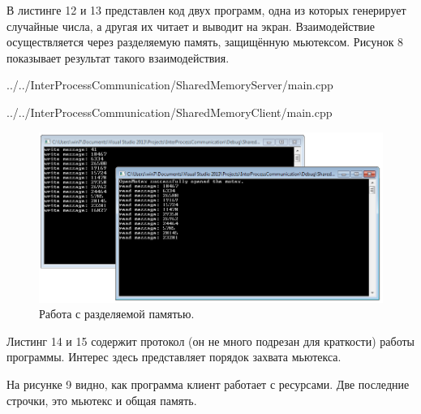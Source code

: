\documentclass[a4paper, 12pt]{report}		%
\begin{document}
В листинге 12 и 13 представлен код двух программ, одна из которых генерирует случайные числа, а другая их читает и выводит на экран. Взаимодействие осуществляется через разделяемую память, защищённую мьютексом. Рисунок 8 показывает результат такого взаимодействия.


{../../InterProcessCommunication/SharedMemoryServer/main.cpp}

\vspace{3em}


{../../InterProcessCommunication/SharedMemoryClient/main.cpp}

\newpage
\begin{figure}[h!]
\centering
\includegraphics[scale=0.75]{res/08_Sharedmemory}
\caption{Работа с разделяемой памятью.}
\end{figure}

Листинг 14 и 15 содержит протокол (он не много подрезан для краткости) работы программы. Интерес здесь представляет порядок захвата мьютекса.





На рисунке 9 видно, как программа клиент работает с ресурсами. Две последние строчки, это мьютекс и общая память.
\end{document}
